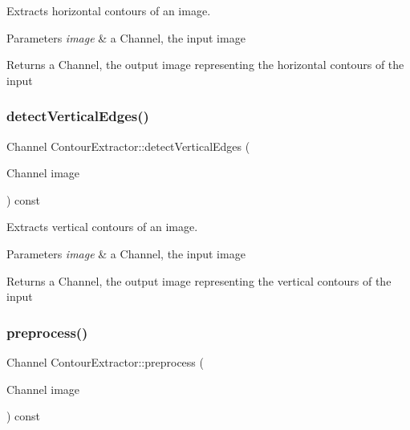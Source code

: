 Extracts horizontal contours of an image. 


\begin{DoxyParams}{Parameters}
{\em image} & a Channel, the input image \\
\hline
\end{DoxyParams}
\begin{DoxyReturn}{Returns}
a Channel, the output image representing the horizontal contours of the input 
\end{DoxyReturn}
\mbox{\label{class_contour_extractor_a3aafc89132984a7b7042f748439b58fb}} 
\subsubsection{\texorpdfstring{detect\+Vertical\+Edges()}{detectVerticalEdges()}}
{\footnotesize\ttfamily Channel Contour\+Extractor\+::detect\+Vertical\+Edges (\begin{DoxyParamCaption}\item[{Channel}]{image }\end{DoxyParamCaption}) const}



Extracts vertical contours of an image. 


\begin{DoxyParams}{Parameters}
{\em image} & a Channel, the input image \\
\hline
\end{DoxyParams}
\begin{DoxyReturn}{Returns}
a Channel, the output image representing the vertical contours of the input 
\end{DoxyReturn}
\mbox{\label{class_contour_extractor_a9c75f77327e9b74e3161963c4784d205}} 
\subsubsection{\texorpdfstring{preprocess()}{preprocess()}}
{\footnotesize\ttfamily Channel Contour\+Extractor\+::preprocess (\begin{DoxyParamCaption}\item[{Channel}]{image }\end{DoxyParamCaption}) const}



